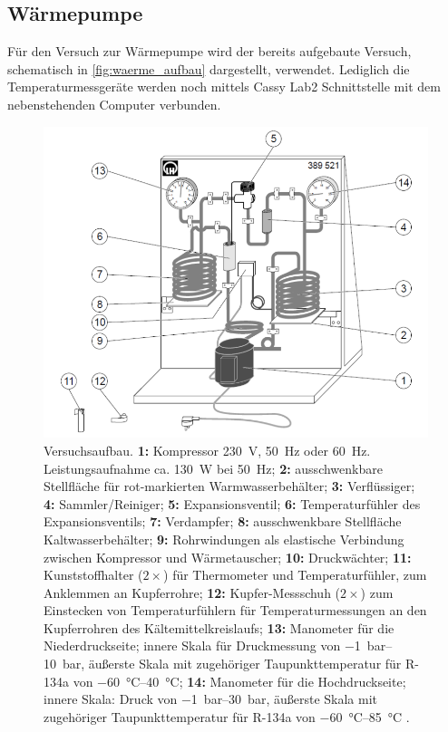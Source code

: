 \documentclass[english, ngerman]{scrartcl}
\begin{document}
\subsection{Wärmepumpe}
\label{subsec:anordnung_waermepumpe}

Für den Versuch zur Wärmepumpe wird der bereits aufgebaute Versuch, schematisch in \autoref{fig:waerme_aufbau} dargestellt, verwendet. Lediglich die Temperaturmessgeräte werden noch mittels Cassy Lab2 Schnittstelle mit dem nebenstehenden Computer verbunden.
%
\begin{figure}[H]
    \centering
    \begin{samepage}
        \includegraphics[width=0.8\linewidth]{fig/Waermepumpe_schematisch.png}
        \caption[Schematischer Aufbau Wärmepumpe]{Versuchsaufbau. \textbf{1:} Kompressor \SI{230}{V}, \SI{50}{Hz} oder \SI{60}{Hz}. Leistungsaufnahme ca. \SI{130}{W} bei \SI{50}{Hz}; \textbf{2:} ausschwenkbare Stellfläche für rot-markierten Warmwasserbehälter; \textbf{3:} Verflüssiger; \textbf{4:} Sammler/Reiniger; \textbf{5:} Expansionsventil; \textbf{6:} Temperaturfühler des Expansionsventils; \textbf{7:} Verdampfer; \textbf{8:} ausschwenkbare Stellfläche Kaltwasserbehälter; \textbf{9:} Rohrwindungen als elastische Verbindung zwischen Kompressor und Wärmetauscher; \textbf{10:} Druckwächter; \textbf{11:} Kunststoffhalter ($2\times$) für Thermometer und Temperaturfühler, zum Anklemmen an Kupferrohre; \textbf{12:} Kupfer-Messschuh ($2\times$) zum Einstecken von Temperaturfühlern für Temperaturmessungen an den Kupferrohren des Kältemittelkreislaufs; \textbf{13:} Manometer für die Niederdruckseite; innere Skala für Druckmessung von \SIrange{-1}{10}{\bar}, äußerste Skala mit zugehöriger Taupunkttemperatur für R-134a von \SIrange{-60}{40}{\celsius}; \textbf{14:} Manometer für die Hochdruckseite; innere Skala: Druck von \SIrange{-1}{30}{\bar}, äußerste Skala mit zugehöriger Taupunkttemperatur für R-134a von \SIrange{-60}{85}{\celsius} \cite{ref:angabe_waerme}.}
        \label{fig:waerme_aufbau}
    \end{samepage}
\end{figure}
\end{document}
